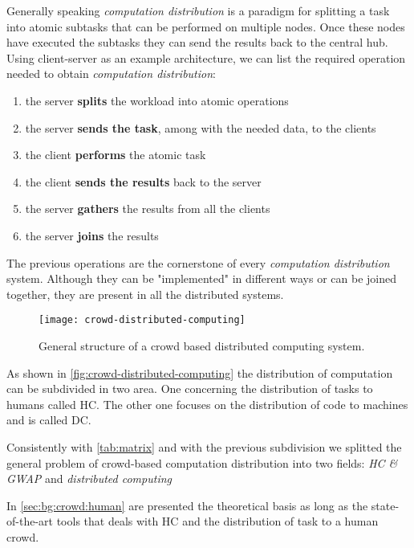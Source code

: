 Generally speaking \emph{computation distribution} is a paradigm for splitting
a task into atomic subtasks that can be performed on multiple nodes. Once
these nodes have executed the subtasks they can send the results back to the
central hub.
Using client-server as an example architecture, we can list the required
operation needed to obtain \emph{computation distribution}:
\begin{enumerate}
    \item the server \textbf{splits} the workload into atomic operations
    \item the server \textbf{sends the task}, among with the needed data, to the
    clients
    \item the client \textbf{performs} the atomic task
    \item the client \textbf{sends the results} back to the server
    \item the server \textbf{gathers} the results from all the clients
    \item the server \textbf{joins} the results
\end{enumerate}
The previous operations are the cornerstone of every \emph{computation
distribution} system. Although they can be "implemented" in different ways or can
be joined together, they are present in all the distributed systems.\\


\begin{figure}[htb]
    \centering
    \texttt{[image: crowd-distributed-computing]}
    \caption{General structure of a crowd based distributed computing system.}
    \label{fig:crowd-distributed-computing}
\end{figure}
As shown in \autoref{fig:crowd-distributed-computing} the distribution of
computation can be subdivided in two area. One concerning the distribution
of tasks to humans called \acf{HC}. The other one focuses on the distribution
of code to machines and is called \acf{DC}.

Consistently with \autoref{tab:matrix} and with the previous subdivision we
splitted the general problem of crowd-based computation distribution into two
fields: \emph{\acl{HC} \& \acl{GWAP}} and \emph{distributed computing}

In \ref{sec:bg:crowd:human} are presented the theoretical basis as long as
the state-of-the-art tools that deals with \ac{HC} and the distribution of task
to a human crowd.

